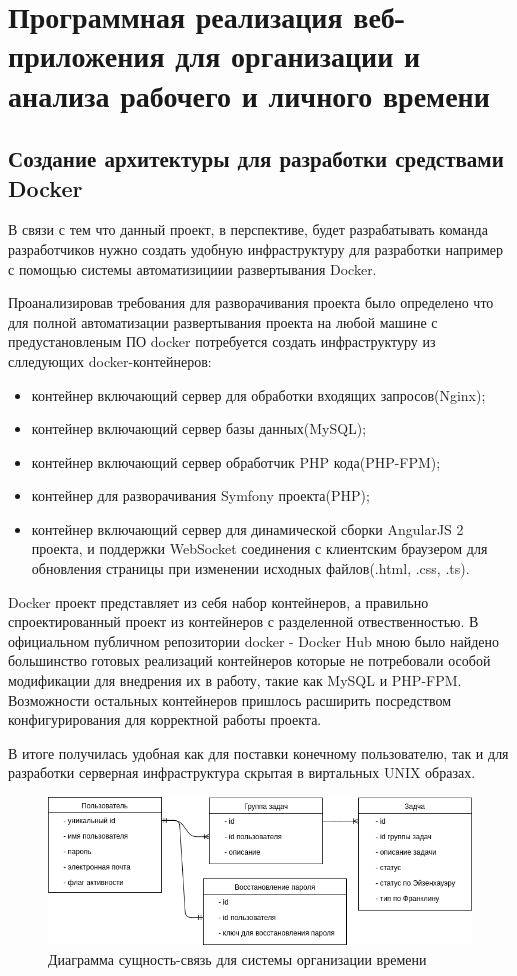 \section{Программная реализация веб-приложения для организации и анализа рабочего и личного времени}

\subsection{Создание архитектуры для разработки средствами Docker}
В связи с тем что данный проект, в перспективе, будет разрабатывать команда разработчиков нужно создать удобную инфраструктуру для разработки например с помощью системы автоматизициии развертывания Docker. 

Проанализировав требования для разворачивания проекта было определено что для полной автоматизации развертывания проекта на любой машине с предустановленым ПО docker потребуется создать инфраструктуру из слледующих docker-контейнеров:
\begin{itemize}
  \item контейнер включающий сервер для обработки входящих запросов(Nginx);
  \item контейнер включающий сервер базы данных(MySQL);
  \item контейнер включающий сервер обработчик PHP кода(PHP-FPM);
  \item контейнер для разворачивания Symfony проекта(PHP);
  \item контейнер включающий сервер для динамической сборки AngularJS 2 проекта, и поддержки WebSocket соединения с клиентским браузером для обновления страницы при изменении исходных файлов(.html, .css, .ts).
\end{itemize}

Docker проект представляет из себя набор контейнеров, а правильно спроектированный проект из контейнеров с разделенной отвественностью. В официальном публичном репозитории docker - Docker Hub мною было найдено большинство готовых реализаций контейнеров которые не потребовали особой модификации для внедрения их в работу, такие как MySQL и PHP-FPM. Возможности остальных контейнеров пришлось расширить посредством конфигурирования для корректной работы проекта.

В итоге получилась удобная как для поставки конечному пользователю, так и для разработки серверная инфраструктура скрытая в виртальных UNIX образах. 


\begin{figure}[ht]
\centering
  \includegraphics[scale=0.5]{images/entity-relation.png}  
  \caption{ Диаграмма сущность-связь для системы организации времени }
  \label{fig:domain:todist}
\end{figure}

